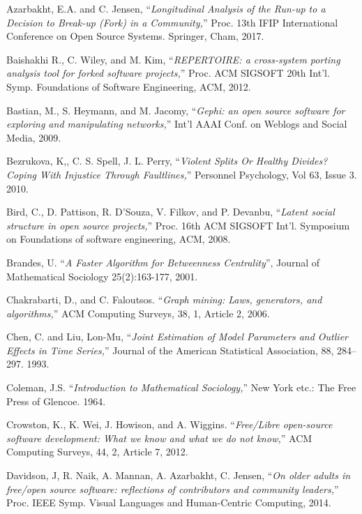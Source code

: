 \begin{thebibliography}{99.}
 Azarbakht, E.A. and C. Jensen, ``\textit{Longitudinal Analysis of the Run-up to a Decision to Break-up (Fork) in a Community,}'' Proc. 13th IFIP International Conference on Open Source Systems. Springer, Cham, 2017.

 Baishakhi R., C. Wiley, and M. Kim, ``\textit{REPERTOIRE: a cross-system porting analysis tool for forked software projects,}'' Proc. ACM SIGSOFT 20th Int'l. Symp. Foundations of Software Engineering, ACM, 2012.

 Bastian, M., S. Heymann, and M. Jacomy, ``\textit{Gephi: an open source software for exploring and manipulating networks,}'' Int'l AAAI Conf. on Weblogs and Social Media, 2009.

 Bezrukova, K,, C. S. Spell, J. L. Perry, ``\textit{Violent Splits Or Healthy Divides? Coping With Injustice Through Faultlines,}'' Personnel Psychology, Vol 63, Issue 3. 2010. 

 Bird, C., D. Pattison, R. D'Souza, V. Filkov, and P. Devanbu, ``\textit{Latent social structure in open source projects,}'' Proc. 16th ACM SIGSOFT Int'l. Symposium on Foundations of software engineering, ACM, 2008.  

 Brandes, U. ``\textit{A Faster Algorithm for Betweenness Centrality}'', Journal of Mathematical Sociology 25(2):163-177, 2001.

 Chakrabarti,  D., and C. Faloutsos. ``\textit{Graph mining: Laws, generators, and algorithms,}'' ACM Computing Surveys, 38, 1, Article 2, 2006.

 Chen, C. and Liu, Lon-Mu, ``\textit{Joint Estimation of Model Parameters and Outlier Effects in Time Series,}'' Journal of the American Statistical Association, 88, 284--297. 1993.

 Coleman, J.S. ``\textit{Introduction to Mathematical Sociology,}'' New York etc.: The Free Press of Glencoe. 1964.

Crowston, K., K. Wei, J. Howison, and A. Wiggins. ``\textit{Free/Libre open-source software development: What we know and what we do not know,}'' ACM Computing Surveys, 44, 2, Article 7, 2012.

 Davidson, J, R. Naik, A. Mannan, A. Azarbakht, C. Jensen, ``\textit{On older adults in free/open source software: reflections of contributors and community leaders,}'' Proc. IEEE Symp. Visual Languages and Human-Centric Computing, 2014.


\end{thebibliography}
